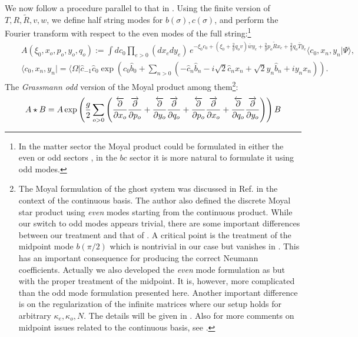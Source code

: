 \documentclass[a4paper,11pt]{article}
\begin{document}
We now follow a procedure parallel to that in \cite{B}. Using the finite
version of $T,R,\tilde{R},v,w$, we define half string modes for $b(\sigma
),c(\sigma )$, and perform the Fourier transform with respect to the even
modes of the full string:\footnote{%
In the matter sector the Moyal product could be formulated in either the
even or odd sectors \cite{B}\cite{moyalMoscow}, in the $bc$ sector it is
more natural to formulate it using odd modes.}
\begin{eqnarray}
&&A(\xi _{0},x_{o},p_{o},y_{o},q_{o}):=\int
dc_{0}\prod_{e>0}(dx_{e}dy_{e})\,e^{-\xi _{0}c_{0}+(\xi _{0}+{\frac{2}{g}}%
q_{o}v)\bar{w}y_{e}+{\frac{2}{g}}p_{o}{\tilde{R}}x_{e}+{\frac{2}{g}}q_{o}%
\bar{T}y_{e}}\langle c_{0},x_{n},y_{n}|\Psi \rangle , \\
&&\langle c_{0},x_{n},y_{n}|=\langle \Omega |{\hat{c}}_{-1}{\hat{c}}_{0}\exp
\left( c_{0}\hat{b}_{0}+\sum_{n>0}\left( -\hat{c}_{n}\hat{b}_{n}-i\sqrt{2}%
\hat{c}_{n}x_{n}+\sqrt{2}y_{n}\hat{b}_{n}+iy_{n}x_{n}\right) \right) .
\end{eqnarray}%
The \textit{Grassmann odd} version of the Moyal product among them\footnote{%
The Moyal formulation of the ghost system was discussed in
Ref.\cite{Erler} in the context of the continuous basis. The
author also defined the discrete Moyal star product using {\it
even} modes starting from the continuous product. While our switch
to odd modes appears trivial, there are some important differences
between our treatment and that of \cite{Erler}. A critical point
is the treatment of the midpoint mode $b(\pi/2)$ which is
nontrivial in our case but vanishes in \cite{Erler}. This has an
important consequence for producing the correct Neumann
coefficients. Actually we also developed the {\em even} mode
formulation as \cite{Erler} but with the proper treatment of the
midpoint. It is, however, more complicated than the odd mode
formulation presented here. Another important difference is on the
regularization of the infinite matrices where our setup holds for
arbitrary $\kappa_e,\kappa_o,N$.
The details will be given in \cite{PREP}. Also for more comments
on midpoint issues related to the continuous basis, see
\cite{moyalMoscow}.}:
\begin{equation}
A\star B=A\exp \left( {\frac{g}{2}}\sum_{o>0}\left( {\frac{\overleftarrow{%
\partial }}{\partial x_{o}}}{\frac{\overrightarrow{\partial }}{\partial p_{o}%
}}+{\frac{\overleftarrow{\partial }}{\partial y_{o}}}{\frac{\overrightarrow{%
\partial }}{\partial q_{o}}}+{\frac{\overleftarrow{\partial }}{\partial p_{o}%
}}{\frac{\overrightarrow{\partial }}{\partial x_{o}}}+{\frac{\overleftarrow{%
\partial }}{\partial q_{o}}}{\frac{\overrightarrow{\partial }}{\partial y_{o}%
}}\right) \right) B
\end{equation}%
\end{document}
